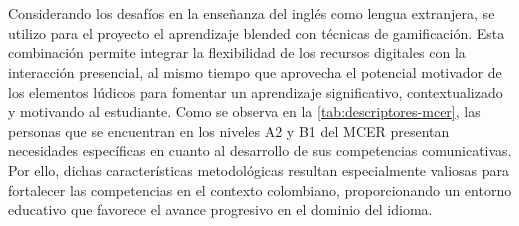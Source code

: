 \\
\\
Considerando los desafíos en la enseñanza del inglés como lengua extranjera, se utilizo para el proyecto el aprendizaje blended con técnicas de gamificación. Esta combinación permite integrar la flexibilidad de los recursos digitales con la interacción presencial, al mismo tiempo que aprovecha el potencial motivador de los elementos lúdicos para fomentar un aprendizaje significativo, contextualizado y motivando al estudiante. Como se observa en la \autoref{tab:descriptores-mcer}, las personas que se encuentran en los niveles A2 y B1 del MCER presentan necesidades específicas en cuanto al desarrollo de sus competencias comunicativas. Por ello, dichas características metodológicas resultan especialmente valiosas para fortalecer las competencias en el contexto colombiano, proporcionando un entorno educativo que favorece el avance progresivo en el dominio del idioma.
